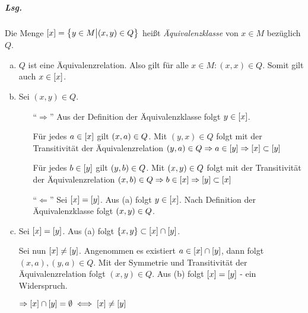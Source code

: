 \documentclass{scrreprt}
\begin{document}
\subparagraph{Lsg.} Die Menge $[x] = \qty\big{y \in M {\big |} (x, y) \in Q}$
heißt \emph{Äquivalenzklasse} von $x \in M$ bezüglich $Q$.
\begin{enumerate}[(a)]
\item $Q$ ist eine Äquivalenzrelation.
  Also gilt für alle $x \in M \colon (x, x) \in Q$.
  Somit gilt auch $x \in \qty[x]$.

\newpage
\item Sei $(x, y) \in Q$.
  \begin{itemize}
  \item[``$\Rightarrow$'']
    Aus der Definition der Äquivalenzklasse folgt
    $y \in \qty[x]$.

    Für jedes $a \in \qty[x]$ gilt $\qty(x, a) \in Q$.
    Mit $(y, x) \in Q$ folgt mit der Transitivität der Äquivalenzrelation
    $\qty(y, a) \in Q \Rightarrow a \in \qty[y] \Rightarrow \qty[x] \subset \qty[y]$

    Für jedes $b \in \qty[y]$ gilt $\qty(y, b) \in Q$.
    Mit $\qty(x, y) \in Q$ folgt mit der Transitivität der Äquivalenzrelation
    $\qty(x, b) \in Q \Rightarrow b \in \qty[x] \Rightarrow \qty[y] \subset \qty[x]$

  \item[``$\Leftarrow$''] Sei $\qty[x] = \qty[y]$.
    Aus (a) folgt $y\in \qty[x]$.
    Nach Definition der Äquivalenzklasse folgt $\qty(x, y) \in Q$.

  \end{itemize}
\item Sei $\qty[x] = \qty[y]$.
  Aus (a) folgt $\qty{x, y} \subset \qty[x] \cap \qty[y]$.

  Sei nun $\qty[x] \ne \qty[y]$.
  Angenommen es existiert $a \in \qty[x] \cap \qty[y]$, dann
  folgt $(x, a), (y, a) \in Q$.
  Mit der Symmetrie und Transitivität der Äquivalenzrelation folgt
  $(x, y) \in Q$.
  Aus (b) folgt $\qty[x] = \qty[y]$ - ein Widerspruch.

  $\Rightarrow \qty[x] \cap \qty[y] = \emptyset \iff \qty[x] \ne \qty[y]$
\end{enumerate}
\end{document}
